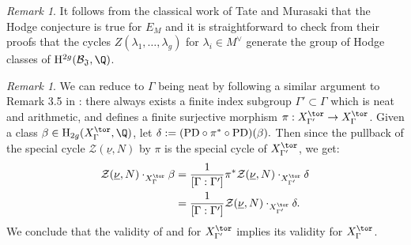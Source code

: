 \documentclass[11pt,letterpaper,english]{amsart}
\numberwithin{equation}{subsection}
\numberwithin{equation}{section}
\newcommand\cB{{\mathcal B}}
\newcommand\cZ{{\mathcal Z}}
\newcommand\fJ{{\mathfrak J}}
\theoremstyle{plain}
\theoremstyle{remark}
\newtheorem{remarque}[theorem]{Remark}
\begin{document}

\begin{remarque}\label{murasaki}
    It follows from the classical work of Tate \cite{tate-hodge} and Murasaki \cite{murasaki-Hodge} that the Hodge conjecture is true for $E_M$ and it is straightforward to check from their proofs that the cycles $Z(\lambda_1,\ldots,\lambda_g)$ for $\lambda_i\in M^\vee$ generate the group of Hodge classes of $\mathrm{H}^{2g}(\cB_{\mathfrak J},\Q)$.
\end{remarque}


\begin{remarque}\label{remark-neat}
We can reduce to $\Gamma$ being neat by following a similar argument to Remark 3.5 in \cite{engel-greer-tayou}: there always exists a finite index subgroup $\Gamma'\subset \Gamma$ which is neat and arithmetic, and defines a finite surjective morphism $\pi:X^{\tor}_{\Gamma'}\rightarrow X^{\tor}_\Gamma$. Given a class $\beta\in \mathrm{H}_{2g}(X^{\tor}_\Gamma,\Q)$, let $\delta:=({\rm PD}\circ \pi^*\circ {\rm PD})(\beta).$ Then since the pullback of the special cycle $\cZ(\underline{\nu},N)$ by $\pi$ is the special cycle of $X^{\tor}_{\Gamma'}$, we get: 
\begin{align*} \cZ(\underline{\nu},N)\cdot_{X_\Gamma^{\tor}} \beta &= \frac{1}{[\Gamma:\Gamma']} \pi^*\cZ(\underline{\nu},N)\cdot_{X_{\Gamma'}^{\tor}} \delta \\ &=\frac{1}{[\Gamma:\Gamma']}
\cZ(\underline{\nu},N)\cdot_{X_{\Gamma'}^{\tor}}\delta.\end{align*}
We conclude that the validity of  and  for $X^{\tor}_{\Gamma'}$ implies its validity for $X^{\tor}_\Gamma$.
\end{remarque}




\end{document}
